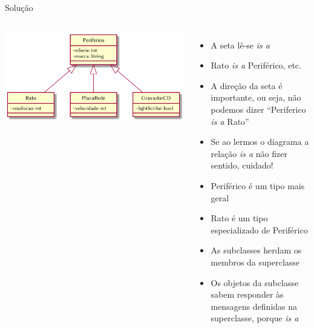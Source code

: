 \documentclass[portuguese, aspectratio=169, xcolor=table]{beamer}
\begin{document}
\begin{frame}{Solução}
\begin{columns}
\begin{center}
    \includegraphics[width=\linewidth]{./uml_diagrams/class8}
\end{center}
\begin{itemize}
    \item A seta lê-se \textit{is a}
    \item Rato \textit{is a} Periférico, etc.
    \item A direção da seta é importante, ou seja, não podemos dizer ``Periferico \textit{is a} Rato''
    \item Se ao lermos o diagrama a relação \textit{is a} não fizer sentido,  cuidado!
    \item Periférico é um tipo mais geral
    \item Rato é um tipo especializado de Periférico
    \item As subclasses herdam os membros da superclasse
    \item Os objetos da subclasse sabem responder às mensagens definidas na superclasse, porque \textit{is a}
\end{itemize}
\end{columns}
\end{frame}
\end{document}
